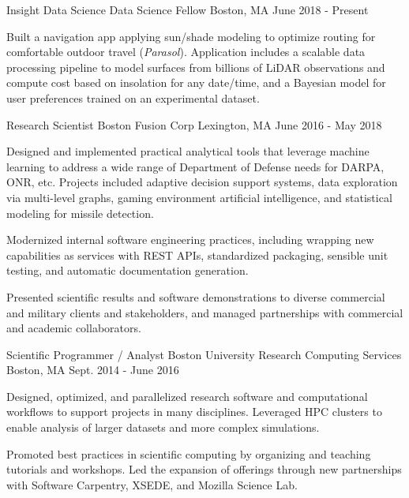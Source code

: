 \documentclass[11pt, letter]{awesome-cv}
\begin{document}
\begin{cventries}
  \cventry
    {Insight Data Science}
    {Data Science Fellow}
    {Boston, MA}
    {June 2018 - Present}
    {
    \begin{cvitems}
      \item{Built a navigation app applying sun/shade modeling to optimize routing for comfortable outdoor travel (\emph{Parasol}). Application includes a scalable data processing pipeline to model surfaces from billions of LiDAR observations and compute cost based on insolation for any date/time, and a Bayesian model for user preferences trained on an experimental dataset.}
    \end{cvitems}
    }
  \cventry
    {Research Scientist}
    {Boston Fusion Corp}
    {Lexington, MA}
    {June 2016 - May 2018}
    {
      \begin{cvitems}
        \item {Designed and implemented practical analytical tools that leverage machine learning to address a wide range of Department of Defense needs for DARPA, ONR, etc. Projects included adaptive decision support systems, data exploration via multi-level graphs, gaming environment artificial intelligence, and statistical modeling for missile detection.}
        \item {Modernized internal software engineering practices, including wrapping new capabilities as services with REST APIs, standardized packaging, sensible unit testing, and automatic documentation generation.}
        \item {Presented scientific results and software demonstrations to diverse commercial and military clients and stakeholders, and managed partnerships with commercial and academic collaborators.}
      \end{cvitems}
    }
  \cventry
    {Scientific Programmer / Analyst}
    {Boston University Research Computing Services}
    {Boston, MA}
    {Sept. 2014 - June 2016}
    {
      \begin{cvitems}
        \item {Designed, optimized, and parallelized research software and computational workflows to support projects in many disciplines. Leveraged HPC clusters to enable analysis of larger datasets and more complex simulations.}
        \item {Promoted best practices in scientific computing by organizing and teaching tutorials and workshops. Led the expansion of offerings through new partnerships with Software Carpentry, XSEDE, and Mozilla Science Lab.}

\end{cvitems}}
\end{cventries}
\end{document}
